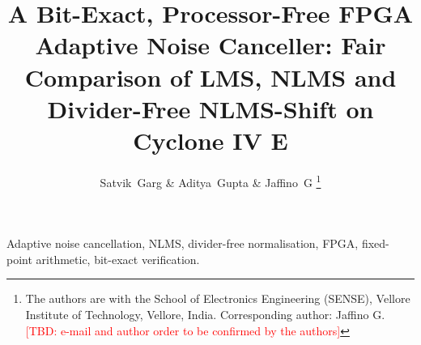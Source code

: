 \documentclass[journal]{IEEEtran}
\newif\ifshowabstract\showabstracttrue %
\newcommand{\TBD}[1]{\textcolor{red}{[TBD: #1]}}
\begin{document}
\title{A Bit-Exact, Processor-Free FPGA Adaptive Noise Canceller: Fair Comparison of LMS, NLMS and
Divider-Free NLMS-Shift on Cyclone IV E}

\author{Satvik~Garg \& Aditya~Gupta \& Jaffino~G%
\thanks{The authors are with the School of Electronics Engineering (SENSE), Vellore Institute of
Technology, Vellore, India. Corresponding author: Jaffino G. \TBD{e-mail and author order to be
confirmed by the authors}}}

\maketitle

\ifshowabstract
\begin{abstract}

\end{abstract}
\fi

\begin{IEEEkeywords}
Adaptive noise cancellation, NLMS, divider-free normalisation, FPGA, fixed-point arithmetic,
bit-exact verification.
\end{IEEEkeywords}





\end{document}
